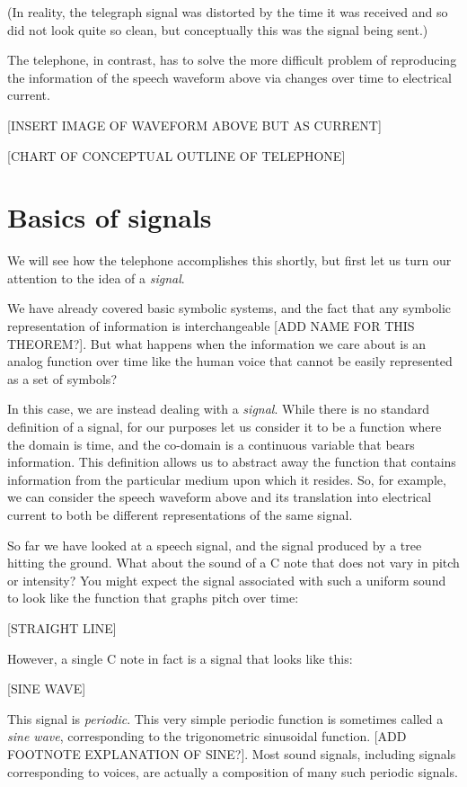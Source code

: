 \documentclass[UTF8]{book}
\begin{document}
\begin{CJK}{UTF8}{gbsn}
(In reality, the telegraph signal was distorted by the time it was received and so did not look quite so clean, but conceptually this was the signal being sent.)

The telephone, in contrast, has to solve the more difficult problem of reproducing the information of the speech waveform above via changes over time to electrical current.

[INSERT IMAGE OF WAVEFORM ABOVE BUT AS CURRENT]

[CHART OF CONCEPTUAL OUTLINE OF TELEPHONE]

\section{Basics of signals}

We will see how the telephone accomplishes this shortly, but first let us turn our attention to the idea of a \emph{signal}.

We have already covered basic symbolic systems, and the fact that any symbolic representation of information is interchangeable [ADD NAME FOR THIS THEOREM?]. But what happens when the information we care about is an analog function over time like the human voice that cannot be easily represented as a set of symbols?

In this case, we are instead dealing with a \emph{signal}. While there is no standard definition of a signal, for our purposes let us consider it to be a function where the domain is time, and the co-domain is a continuous variable that bears information. This definition allows us to abstract away the function that contains information from the particular medium upon which it resides. So, for example, we can consider the speech waveform above and its translation into electrical current to both be different representations of the same signal.

So far we have looked at a speech signal, and the signal produced by a tree hitting the ground. What about the sound of a C note that does not vary in pitch or intensity? You might expect the signal associated with such a uniform sound to look like the function that graphs pitch over time:

[STRAIGHT LINE]

However, a single C note in fact is a signal that looks like this:

[SINE WAVE]

This signal is \emph{periodic}. This very simple periodic function is sometimes called a \emph{sine wave}, corresponding to the trigonometric sinusoidal function. [ADD FOOTNOTE EXPLANATION OF SINE?]. Most sound signals, including signals corresponding to voices, are actually a composition of many such periodic signals.


\end{CJK}
\end{document}

